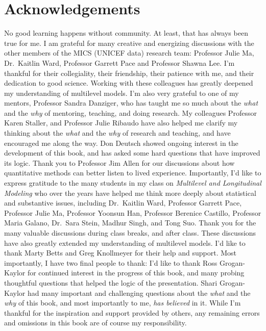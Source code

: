 \documentclass[
  letterpaper,
  DIV=11,
  numbers=noendperiod]{scrreprt}
\begin{document}

\chapter*{Acknowledgements}\label{acknowledgements}


No good learning happens without community. At least, that has always
been true for me. I am grateful for many creative and energizing
discussions with the other members of the MICS (UNICEF data) research
team: Professor Julie Ma, Dr.~Kaitlin Ward, Professor Garrett Pace and
Professor Shawna Lee. I'm thankful for their collegiality, their
friendship, their patience with me, and their dedication to good
science. Working with these colleagues has greatly deepened my
understanding of multilevel models. I'm also very grateful to one of my
mentors, Professor Sandra Danziger, who has taught me so much about the
\emph{what} and the \emph{why} of mentoring, teaching, and doing
research. My colleagues Professor Karen Staller, and Professor Julie
Ribaudo have also helped me clarify my thinking about the \emph{what}
and the \emph{why} of research and teaching, and have encouraged me
along the way. Don Deutsch showed ongoing interest in the development of
this book, and has asked some hard questions that have improved its
logic. Thank you to Professor Jim Allen for our discussions about how
quantitative methods can better listen to lived experience. Importantly,
I'd like to express gratitude to the many students in my class on
\emph{Multilevel and Longitudinal Modeling} who over the years have
helped me think more deeply about statistical and substantive issues,
including Dr.~Kaitlin Ward, Professor Garrett Pace, Professor Julie Ma,
Professor Yoonsun Han, Professor Berenice Castillo, Professor Maria
Galano, Dr.~Sara Stein, Madhur Singh, and Tong Suo. Thank you for the
many valuable discussions during class breaks, and after class. These
discussions have also greatly extended my understanding of multilevel
models. I'd like to thank Marty Betts and Greg Knollmeyer for their help
and support. Most importantly, I have two final people to thank: I'd
like to thank Ross Grogan-Kaylor for continued interest in the progress
of this book, and many probing thoughtful questions that helped the
logic of the presentation. Shari Grogan-Kaylor had many important and
challenging questions about the \emph{what} and the \emph{why} of this
book, and most importantly to me, \emph{has believed} in it. While I'm
thankful for the inspiration and support provided by others, any
remaining errors and omissions in this book are of course my
responsibility.
\end{document}
